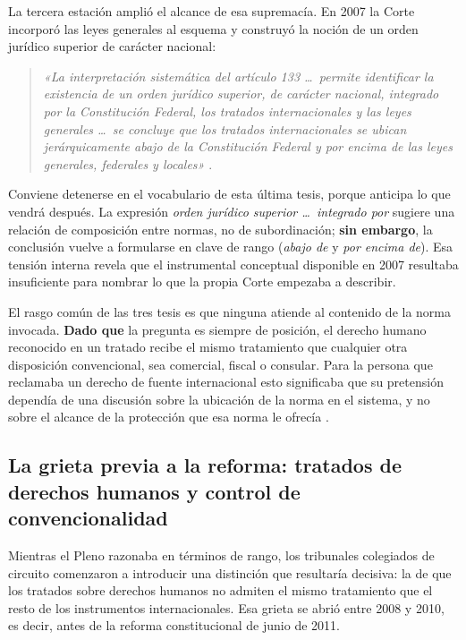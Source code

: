 \documentclass[
  spanish,
  letterpaper, oneside
]{article}
\begin{document}
La tercera estación amplió el alcance de esa supremacía. En 2007 la Corte incorporó las leyes generales al esquema y construyó la noción de un orden jurídico superior de carácter nacional:

\begin{quote}
\textit{«La interpretación sistemática del artículo 133 \dots\ permite identificar la existencia de un orden jurídico superior, de carácter nacional, integrado por la Constitución Federal, los tratados internacionales y las leyes generales \dots\ se concluye que los tratados internacionales se ubican jerárquicamente abajo de la Constitución Federal y por encima de las leyes generales, federales y locales»} \citep[tesis P. IX/2007]{scjnTesis172650}.
\end{quote}

Conviene detenerse en el vocabulario de esta última tesis, porque anticipa lo que vendrá después. La expresión \textit{orden jurídico superior \dots\ integrado por} sugiere una relación de composición entre normas, no de subordinación; \textbf{sin embargo}, la conclusión vuelve a formularse en clave de rango (\textit{abajo de} y \textit{por encima de}). Esa tensión interna revela que el instrumental conceptual disponible en 2007 resultaba insuficiente para nombrar lo que la propia Corte empezaba a describir.

El rasgo común de las tres tesis es que ninguna atiende al contenido de la norma invocada. \textbf{Dado que} la pregunta es siempre de posición, el derecho humano reconocido en un tratado recibe el mismo tratamiento que cualquier otra disposición convencional, sea comercial, fiscal o consular. Para la persona que reclamaba un derecho de fuente internacional esto significaba que su pretensión dependía de una discusión sobre la ubicación de la norma en el sistema, y no sobre el alcance de la protección que esa norma le ofrecía \citep{alvarezIcazaDerechosMexico}.

\subsection{La grieta previa a la reforma: tratados de derechos humanos y control de convencionalidad}

Mientras el Pleno razonaba en términos de rango, los tribunales colegiados de circuito comenzaron a introducir una distinción que resultaría decisiva: la de que los tratados sobre derechos humanos no admiten el mismo tratamiento que el resto de los instrumentos internacionales. Esa grieta se abrió entre 2008 y 2010, es decir, antes de la reforma constitucional de junio de 2011.
\end{document}
